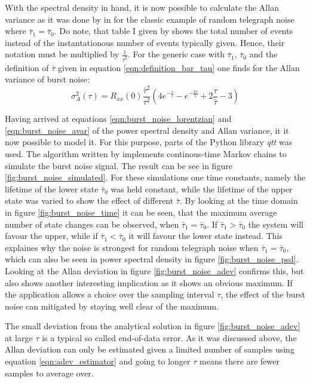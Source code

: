 With the spectral density in hand, it is now possible to calculate the Allan variance as it was done by \citeauthor{allen_dev_flicker} in \cite{allen_dev_flicker} for the classic example of random telegraph noise where $\bar \tau_1 = \bar \tau_0$. Do note, that table I given by \citeauthor{allen_dev_flicker} shows the total number of events instead of the instantationous number of events typically given. Hence, their notation must be multiplied by $\frac{1}{\bar \tau^2}$. For the generic case with $\bar \tau_1$, $\bar \tau_0$ and the definition of $\bar \tau$ given in equation \ref{eqn:definition_bar_tau} one finds for the Allan variance of burst noise:
\begin{equation}
    \sigma^2_A(\tau) = R_{xx}(0) \frac{\bar \tau^2}{\tau^2} \left(4 e^{-\frac{\tau}{\bar \tau}} - e^{-\frac{2 \tau}{\bar \tau}} + 2 \frac{\tau}{\bar \tau} - 3 \right) \label{eqn:burst_noise_avar}
\end{equation}

Having arrived at equations \ref{eqn:burst_noise_lorentzian} and \ref{eqn:burst_noise_avar} of the power spectral density and Allan variance, it it now possible to model it. For this purpose, parts of the Python library \textit{qtt} \cite{qtt} was used. The algorithm written by \citeauthor{qtt} implements continous-time Markov chains to simulate the burst noise signal. The result can be see in figure \ref{fig:burst_noise_simulated}. For these simulations one time constants, namely the lifetime of the lower state $\bar \tau_0$ was held constant, while the lifetime of the upper state was varied to show the effect of different $\bar \tau$. By looking at the time domain in figure \ref{fig:burst_noise_time} it can be seen, that the maximum average number of state changes can be observed, when $\bar \tau_1 = \bar \tau_0$. If $\bar \tau_1 > \bar \tau_0$ the system will favour the upper, while if $\bar \tau_1 < \bar \tau_0$ it will favour the lower state instead. This explaines why the noise is strongest for random telegraph noise when $\bar \tau_1 = \bar \tau_0$, which can also be seen in power spectral density in figure \ref{fig:burst_noise_psd}. Looking at the Allan deviation in figure \ref{fig:burst_noise_adev} confirms this, but also shows another interesting implication as it shows an obvious maximum. If the application allows a choice over the sampling interval $\tau$, the effect of the burst noise can mitigated by staying well clear of the maximum.

The small deviation from the analytical solution in figure \ref{fig:burst_noise_adev}  at large $\tau$ is a typical so called end-of-data error. As it was discussed above, the Allan deviation can only be estimated given a limited number of samples using equation \ref{eqn:adev_estimator} and going to longer $\tau$ means there are fewer samples to average over.

